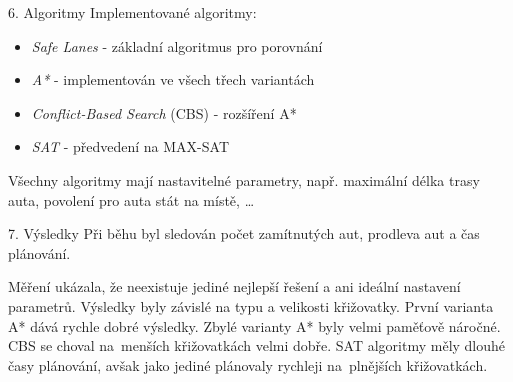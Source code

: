 \documentclass[portrait,fontscale=0.26,paperwidth=842mm,paperheight=1185mm]{baposter}
\begin{document}
\begin{poster}
\begin{posterbox}[column=1, name=algoritmy, below=ukazka]{6. Algoritmy}
			Implementované algoritmy:
			\begin{itemize}
				\item \textit{Safe Lanes} - základní algoritmus pro porovnání
				\item \textit{A*} - implementován ve všech třech variantách
				\item \textit{Conflict-Based Search} (CBS) - rozšíření A*
				\item \textit{SAT} - předvedení na MAX-SAT
			\end{itemize}

			Všechny algoritmy mají nastavitelné parametry, např.
			maximální délka trasy auta, povolení pro auta stát na místě, \dots
		\end{posterbox}

		\begin{posterbox}[column=1, name=vysledky, below=algoritmy, headerColorOne=purple!24, boxColorOne=purple!8]{7. Výsledky}
			Při běhu byl sledován počet zamítnutých aut, prodleva aut a čas plánování.

			Měření ukázala, že neexistuje jediné nejlepší řešení a ani ideální nastavení parametrů.
			Výsledky byly závislé na typu a velikosti křižovatky.
			První varianta A* dává rychle dobré výsledky.
			Zbylé varianty A* byly velmi paměťově náročné.
			CBS se choval na~menších křižovatkách velmi dobře.
			SAT algoritmy měly dlouhé časy plánování,
			avšak jako jediné plánovaly rychleji na~plnějších křižovatkách.
		\end{posterbox}
	\end{poster}
\end{document}
